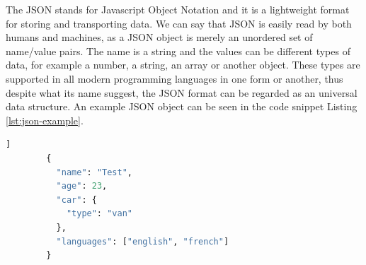 The JSON stands for Javascript Object Notation and it is a lightweight format for storing and transporting data. We can say that JSON is easily read by both humans and machines, as a JSON object is merely an unordered set of name/value pairs. The name is a string and the values can be different types of data, for example a number, a string, an array or another object. These types are supported in all modern programming languages in one form or another, thus despite what its name suggest, the JSON format can be regarded as an universal data structure.\cite{json} An example JSON object can be seen in the code snippet Listing \ref{lst:json-example}.

\begin{center}
	\begin{minipage}{0.6\linewidth}
		\begin{lstlisting}[language=Python, caption={Example JSON}, label={lst:json-example}]]
		{
		  "name": "Test",
		  "age": 23,
		  "car": {
		    "type": "van"
		  },
		  "languages": ["english", "french"]
		}
		\end{lstlisting}
	\end{minipage}
\end{center}





